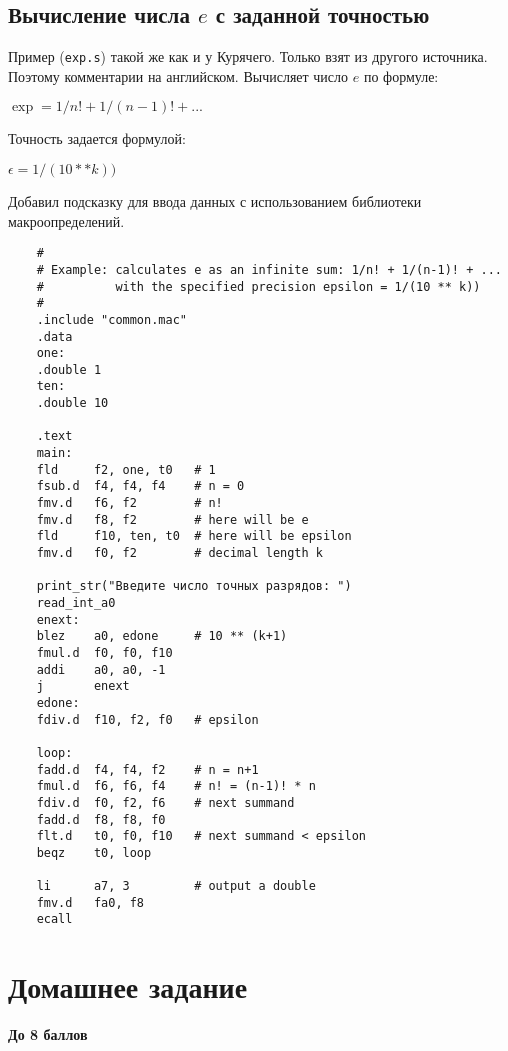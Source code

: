\subsection{Вычисление числа $e$ с заданной точностью}

Пример (\verb|exp.s|) такой же как и у Курячего. Только взят из другого источника. Поэтому комментарии на английском. Вычисляет число $e$ по формуле:

$\exp = 1/n! + 1/(n-1)! + ...$

Точность задается формулой:

$\epsilon = 1/(10 ** k))$

Добавил подсказку для ввода  данных с использованием библиотеки макроопределений.

\begin{verbatim}
    #
    # Example: calculates e as an infinite sum: 1/n! + 1/(n-1)! + ...
    #          with the specified precision epsilon = 1/(10 ** k))
    #
    .include "common.mac"
    .data
    one:
    .double 1
    ten:
    .double 10

    .text
    main:
    fld     f2, one, t0   # 1
    fsub.d  f4, f4, f4    # n = 0
    fmv.d   f6, f2        # n!
    fmv.d   f8, f2        # here will be e
    fld     f10, ten, t0  # here will be epsilon
    fmv.d   f0, f2        # decimal length k

    print_str("Введите число точных разрядов: ")
    read_int_a0
    enext:
    blez    a0, edone     # 10 ** (k+1)
    fmul.d  f0, f0, f10
    addi    a0, a0, -1
    j       enext
    edone:
    fdiv.d  f10, f2, f0   # epsilon

    loop:
    fadd.d  f4, f4, f2    # n = n+1
    fmul.d  f6, f6, f4    # n! = (n-1)! * n
    fdiv.d  f0, f2, f6    # next summand
    fadd.d  f8, f8, f0
    flt.d   t0, f0, f10   # next summand < epsilon
    beqz    t0, loop

    li      a7, 3         # output a double
    fmv.d   fa0, f8
    ecall
\end{verbatim}

\section{Домашнее задание}


\textbf{До 8 баллов}

